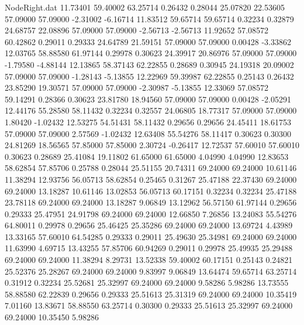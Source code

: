 \begin{filecontents}{NodeRight.dat}
  11.73401   59.40002   63.25714     0.26432    0.28044   25.07820   22.53605   57.09000   57.09000   -2.31002   -6.16714
  11.83512   59.65714   59.65714     0.32234    0.32879   24.68757   22.08896   57.09000   57.09000   -2.56713   -2.56713
  11.92652   57.08572   60.42862     0.29011    0.29333   24.64789   21.59151   57.09000   57.09000    0.00428   -3.33862
  12.03765   58.88580   61.97144     0.29978    0.30623   24.39917   20.86976   57.09000   57.09000   -1.79580   -4.88144
  12.13865   58.37143   62.22855     0.28689    0.30945   24.19318   20.09002   57.09000   57.09000   -1.28143   -5.13855
  12.22969   59.39987   62.22855     0.25143    0.26432   23.85290   19.30571   57.09000   57.09000   -2.30987   -5.13855
  12.33069   57.08572   59.14291     0.28366    0.30623   23.81780   18.94560   57.09000   57.09000    0.00428   -2.05291
  12.44176   55.28580   58.11432     0.32234    0.32557   24.06805   18.77317   57.09000   57.09000    1.80420   -1.02432
  12.53275   54.51431   58.11432     0.29656    0.29656   24.45411   18.61753   57.09000   57.09000    2.57569   -1.02432
  12.63408   55.54276   58.11417     0.30623    0.30300   24.81269   18.56565   57.85000   57.85000    2.30724   -0.26417
  12.72537   57.60010   57.60010     0.30623    0.28689   25.41084   19.11802   61.65000   61.65000    4.04990    4.04990
  12.83653   58.62854   57.85706     0.25788    0.28044   25.51155   20.74311   69.24000   69.24000   10.61146   11.38294
  12.93756   56.05713   58.62854     0.25465    0.31267   25.47188   22.37430   69.24000   69.24000   13.18287   10.61146
  13.02853   56.05713   60.17151     0.32234    0.32234   25.47188   23.78118   69.24000   69.24000   13.18287    9.06849
  13.12962   56.57150   61.97144     0.29656    0.29333   25.47951   24.91798   69.24000   69.24000   12.66850    7.26856
  13.24083   55.54276   64.80011     0.29978    0.29656   25.46425   25.35286   69.24000   69.24000   13.69724    4.43989
  13.33165   57.60010   64.54285     0.29333    0.29011   25.49630   25.34981   69.24000   69.24000   11.63990    4.69715
  13.43255   57.85706   60.94269     0.29011    0.29978   25.49935   25.29488   69.24000   69.24000   11.38294    8.29731
  13.52338   59.40002   60.17151     0.25143    0.24821   25.52376   25.28267   69.24000   69.24000    9.83997    9.06849
  13.64474   59.65714   63.25714     0.31912    0.32234   25.52681   25.32997   69.24000   69.24000    9.58286    5.98286
  13.73555   58.88580   62.22839     0.29656    0.29333   25.51613   25.31319   69.24000   69.24000   10.35419    7.01160
  13.83671   58.88550   63.25714     0.30300    0.29333   25.51613   25.32997   69.24000   69.24000   10.35450    5.98286

\end{filecontents}
